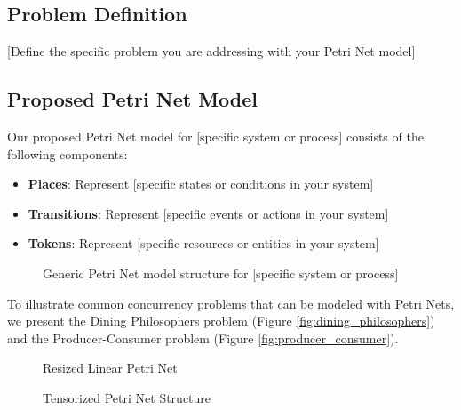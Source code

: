 \subsection{Problem Definition}

[Define the specific problem you are addressing with your Petri Net model]

\subsection{Proposed Petri Net Model}

Our proposed Petri Net model for [specific system or process] consists of the following components:

\begin{itemize}
    \item \textbf{Places}: Represent [specific states or conditions in your system]
    \item \textbf{Transitions}: Represent [specific events or actions in your system]
    \item \textbf{Tokens}: Represent [specific resources or entities in your system]
\end{itemize}

\begin{figure}[htbp]
\centering

\caption{Generic Petri Net model structure for [specific system or process]}
\label{fig:petri_net_generic_model}
\end{figure}

To illustrate common concurrency problems that can be modeled with Petri Nets, we present the Dining Philosophers problem (Figure \ref{fig:dining_philosophers}) and the Producer-Consumer problem (Figure \ref{fig:producer_consumer}).

\begin{figure*}[htbp]
\centering

\caption{Petri Net model of the Dining Philosophers problem}
\label{fig:dining_philosophers}
\end{figure*}

\begin{figure}[htbp]
\centering
\resizebox{0.88\columnwidth}{!}{}
\caption{Resized Linear Petri Net}
\label{fig:linear_petri_resized}
\end{figure}

\begin{figure}[htbp]
\centering

\caption{Tensorized Petri Net Structure}
\label{fig:tensor_petri}
\end{figure}

